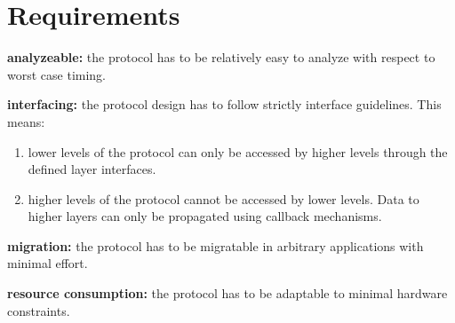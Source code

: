 \section{Requirements}

\begin{req}
\label{req:ulftrtp:analyzeable}
\textbf{analyzeable: }the protocol has to be relatively easy to analyze with respect to worst case timing.
\end{req}

\begin{req}
\label{req:ulftrtp:interfacing}
\textbf{interfacing: }the protocol design has to follow strictly interface guidelines. This means:
\begin{enumerate}
 \item lower levels of the protocol can only be accessed by higher levels through the defined layer interfaces.
 \item higher levels of the protocol cannot be accessed by lower levels. Data to higher layers can only be propagated using callback mechanisms. 
\end{enumerate}

\end{req}

\begin{req}
\label{req:ulftrtp:easy migration}
\textbf{migration: }the protocol has to be migratable in arbitrary applications with minimal effort.
\end{req}

\begin{req}
\label{req:ulftrtp:resource consumption}
\textbf{resource consumption: }the protocol has to be adaptable to minimal hardware constraints.
\end{req}

